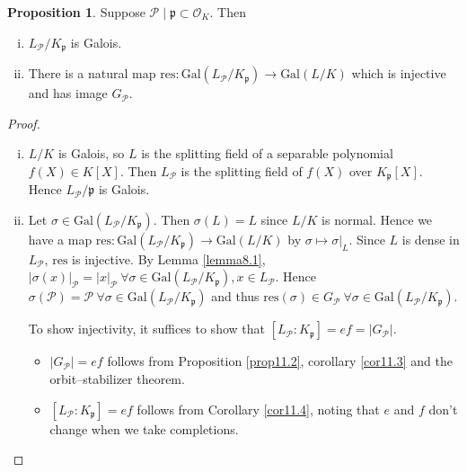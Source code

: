 \documentclass{article}
\theoremstyle{definition}
\newtheorem{prop}[theorem]{Proposition}
\begin{document}
\begin{prop}
    Suppose $\mathcal{P} \mid \mathfrak{p} \subset \mathcal{O}_K$. Then 
    \begin{enumerate}[(i)]
        \item $L_{\mathcal{P}}/K_{\mathfrak{p}}$ is Galois.
        \item There is a natural map $\text{res}: \text{Gal}(L_{\mathcal{P}}/K_{\mathfrak{p}}) \to \text{Gal}(L/K)$ which is injective and has image $G_{\mathcal{P}}$.
    \end{enumerate} 
\end{prop}
\begin{proof}
    \begin{enumerate}[(i)]
        \item $L/K$ is Galois, so $L$ is the splitting field of a separable polynomial $f(X) \in K[X]$. Then $L_{\mathcal{P}}$ is the splitting field of $f(X)$ over $K_{\mathfrak{p}}[X]$. Hence $L_{\mathcal{P}}/\mathfrak{p}$ is Galois.
        \item Let $\sigma \in \text{Gal}(L_{\mathcal{P}}/K_{\mathfrak{p}})$. Then $\sigma(L)=L$ since $L/K$ is normal. Hence we have a map $\text{res}: \text{Gal}(L_{\mathcal{P}}/K_{\mathfrak{p}}) \to \text{Gal}(L/K)$ by $\sigma \mapsto \sigma|_L$. Since $L$ is dense in $L_{\mathcal{P}}$, $\text{res}$ is injective. By Lemma \ref{lemma8.1}, $|\sigma(x)|_\mathcal{P}=|x|_{\mathcal{P}}~\forall \sigma \in \text{Gal}(L_{\mathcal{P}}/K_{\mathfrak{p}}), x \in L_{\mathcal{P}}$. Hence $\sigma(\mathcal{P}) = \mathcal{P} ~\forall \sigma \in \text{Gal}(L_{\mathcal{P}}/K_{\mathfrak{p}})$ and thus $\text{res}(\sigma) \in G_{\mathcal{P}}~\forall \sigma \in \text{Gal}(L_{\mathcal{P}}/K_{\mathfrak{p}})$. 
        \vspace{1mm}
         
        To show injectivity, it suffices to show that $[L_{\mathcal{P}}: K_{\mathfrak{p}}] = ef = |G_{\mathcal{P}}|$.
        \begin{itemize}
            \item $|G_{\mathcal{P}}|=ef$ follows from Proposition \ref{prop11.2}, corollary \ref{cor11.3} and the orbit--stabilizer theorem.
            \item $[L_{\mathcal{P}}:K_{\mathfrak{p}}]=ef$ follows from Corollary \ref{cor11.4}, noting that $e$ and $f$ don't change when we take completions.
        \end{itemize}
    \end{enumerate}
\end{proof}
\end{document}
